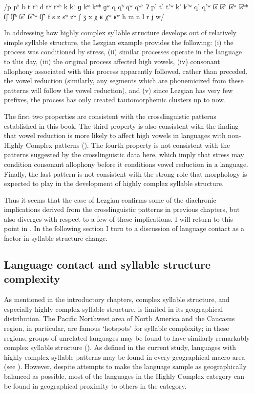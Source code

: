 /p pʰ b t tʰ d tʷ tʷʰ k kʰ ɡ kʷ kʷʰ ɡʷ q qʰ qʷ qʷʰ ʔ p’ t’ t’ʷ k’ k’ʷ q’ q’ʷ t͡s t͡sʰ t͡sʷ t͡sʷʰ t͡ʃ t͡ʃʰ t͡s’ t͡s’ʷ t͡ʃ’ f s z sʷ zʷ ʃ ʒ x χ ʁ χʷ ʁʷ h m n l r j w/
\z

  In addressing how highly complex syllable structure develops out of relatively simple syllable structure, the Lezgian example provides the following: (i) the process was conditioned by stress, (ii) similar processes operate in the language to this day, (iii) the original process affected high vowels, (iv) consonant allophony associated with this process apparently followed, rather than preceded, the vowel reduction (similarly, any segments which are phonemicized from these patterns will follow the vowel reduction), and (v) since Lezgian has very few prefixes, the process has only created tautomorphemic clusters up to now. 

  The first two properties are consistent with the crosslinguistic patterns established in this book. The third property is also consistent with the finding that vowel reduction is more likely to affect high vowels in languages with non-Highly Complex patterns (). The fourth property is not consistent with the patterns suggested by the crosslinguistic data here, which imply that stress may condition consonant allophony before it conditions vowel reduction in a language. Finally, the last pattern is not consistent with the strong role that morphology is expected to play in the development of highly complex syllable structure.

  Thus it seems that the case of Lezgian confirms some of the diachronic implications derived from the crosslinguistic patterns in previous chapters, but also diverges with respect to a few of these implications. I will return to this point in . In the following section I turn to a discussion of language contact as a factor in syllable structure change.

\subsection{Language contact and syllable structure complexity}\label{sec:8.4.5}

  As mentioned in the introductory chapters, complex syllable structure, and especially highly complex syllable structure, is limited in its geographical distribution. The Pacific Northwest area of North America and the Caucasus region, in particular, are famous ‘hotspots’ for syllable complexity; in these regions, groups of unrelated languages may be found to have similarly remarkably complex syllable structure (\citealt{Chirikba2008,ThompsonKinkade1990}). As defined in the current study, languages with highly complex syllable patterns may be found in every geographical macro-area (see ). However, despite attempts to make the language sample as geographically balanced as possible, most of the languages in the Highly Complex category can be found in geographical proximity to others in the category.

